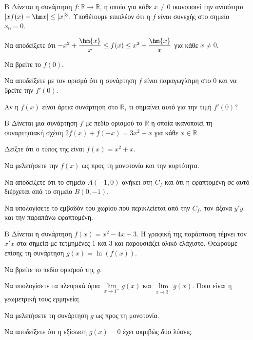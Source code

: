 \begin{thema}{Β}
Δίνεται η συνάρτηση $f: \mathbb{R} \to \mathbb{R}$, η οποία για κάθε $x \ne 0$ ικανοποιεί την ανισότητα $\left| x f(x) - \hm x \right| \le |x|^3$. Υποθέτουμε επιπλέον ότι η $f$ είναι συνεχής στο σημείο $x_0=0$.
\begin{erwthma}
  \item Να αποδείξετε ότι $ -x^2+\dfrac{\hm{x}}{x}\le f(x)\leq x^2+\dfrac{\hm{x}}{x}$ για κάθε $x\neq 0$.
  \item Να βρείτε το $f(0)$.
  \item Να αποδείξετε με τον ορισμό ότι η συνάρτηση $f$ είναι παραγωγίσιμη στο $0$ και να βρείτε την $f'(0)$.
  \item Αν η $f(x)$ είναι άρτια συνάρτηση στο $\mathbb{R}$, τι σημαίνει αυτό για την τιμή $f'(0)$?
\end{erwthma}
\end{thema}

\begin{thema}{Β}
Δίνεται μια συνάρτηση $f$ με πεδίο ορισμού το $\mathbb{R}$ η οποία ικανοποιεί τη συναρτησιακή σχέση $2f(x) + f(-x) = 3x^2 + x$ για κάθε $x \in \mathbb{R}$.
\begin{erwthma}
  \item Δείξτε ότι ο τύπος της είναι $f(x) = x^2 + x$.
  \item Να μελετήσετε την $f(x)$ ως προς τη μονοτονία και την κυρτότητα.
  \item Να αποδείξετε ότι το σημείο $Α(-1, 0)$ ανήκει στη $C_f$ και ότι η εφαπτομένη σε αυτό διέρχεται από το σημείο $Β(0, -1)$.
  \item Να υπολογίσετε το εμβαδόν του χωρίου που περικλείεται από την $C_f$, τον άξονα $y'y$ και την παραπάνω εφαπτομένη.
\end{erwthma}
\end{thema}

\begin{thema}{Β}
Δίνεται η συνάρτηση $f(x) = x^2 - 4x + 3$. Η γραφική της παράσταση τέμνει τον $x'x$ στα σημεία με τετμημένες $1$ και $3$ και παρουσιάζει ολικό ελάχιστο. Θεωρούμε επίσης τη συνάρτηση $g(x) = \ln(f(x))$.
\begin{erwthma}
  \item Να βρείτε το πεδίο ορισμού της $g$.
  \item Να υπολογίσετε τα πλευρικά όρια $\lim\limits_{x \to 1^-} g(x)$ και $\lim\limits_{x \to 3^+} g(x)$. Ποια είναι η γεωμετρική τους ερμηνεία;
  \item Να μελετήσετε τη συνάρτηση $g$ ως προς τη μονοτονία.
  \item Να αποδείξετε ότι η εξίσωση $g(x) = 0$ έχει ακριβώς δύο λύσεις.
\end{erwthma}
\end{thema}

